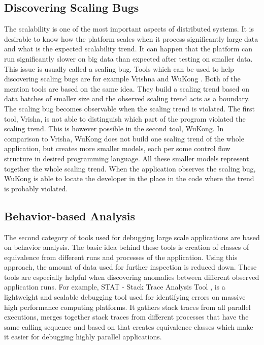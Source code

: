 \subsection{Discovering Scaling Bugs}
The scalability is one of the most important aspects of distributed systems. It is desirable to know how the platform scales when it process significantly large data and what is the expected scalability trend. It can happen that the platform can run significantly slower on big data than expected after testing on smaller data. This issue is usually called a scaling bug. Tools which can be used to help discovering scaling bugs are for example Vrishna and WuKong \cite{HPC}. Both of the mention tools are based on the same idea. They build a scaling trend based on data batches of smaller size and the observed scaling trend acts as a boundary. The scaling bug becomes observable when the scaling trend is violated. The first tool, Vrisha, is not able to distinguish which part of the program violated the scaling trend. This is however possible in the second tool, WuKong. In comparison to Vrisha, WuKong does not build one scaling trend of the whole application, but creates more smaller models, each per some control flow structure in desired programming language. All these smaller models represent together the whole scaling trend. When the application observes the scaling bug, WuKong is able to locate the developer in the place in the code where the trend is probably violated.

\subsection{Behavior-based Analysis}
The second category of tools used for debugging large scale applications are based on behavior analysis. The basic idea behind these tools is creation of classes of equivalence from different runs and processes of the application. Using this approach, the amount of data used for further inspection is reduced down. These tools are especially helpful when discovering anomalies between different observed application runs. For example, STAT - Stack Trace Analysis Tool \cite{HPC}, is a lightweight and scalable debugging tool used for identifying errors on massive high performance computing platforms. It gathers stack traces from all parallel executions, merges together stack traces from different processes that have the same calling sequence and based on that creates equivalence classes which make it easier for debugging highly parallel applications. 

